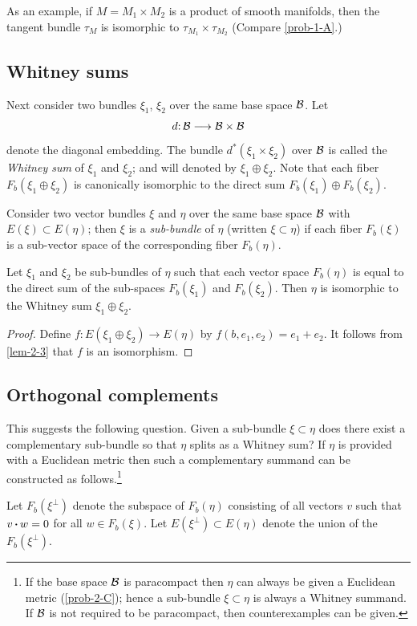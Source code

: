 As an example, if $M = M_1 \times M_2$ is a product of smooth manifolds,
then the tangent bundle $\tau_M$ is isomorphic to $\tau_{M_1}\times \tau_{M_2}$
(Compare
\cref{prob-1-A}.)
\subsection*{Whitney sums}
Next consider two bundles $\xi_1$, $\xi_2$ over the same
base space $\mathcal{B}$. Let
\[d\mathpunct{:}\mathcal{B}\longrightarrow \mathcal{B}\times\mathcal{B} \]
denote the diagonal embedding. The bundle $d^*(\xi_1\times\xi_2)$ over $\mathcal{B}$ is
called the \textit{Whitney sum} of $\xi_1$ and $\xi_2$; and will denoted by $\xi_1\oplus\xi_2$.
Note that each fiber $F_b(\xi_1\oplus\xi_2)$ is canonically isomorphic to the direct
sum
$F_b(\xi_1)\oplus F_b(\xi_2)$.
\begin{definition}\label{def:3-2}
	Consider two vector bundles $\xi$ and $\eta$ over the same base space $\mathcal{B}$ with $E(\xi ) \subset E(\eta)$; then $\xi$ is a \textit{sub-bundle} of $\eta$ (written
	$\xi\subset\eta$) if each fiber $F_b(\xi)$ is a sub-vector space of the corresponding fiber $F_b(\eta)$.
\end{definition}
\begin{lemma}\label{lem-3-2}
	Let $\xi_1$ and $\xi_2$ be sub-bundles of $\eta$ such that
	each vector space $F_b (\eta)$ is equal to the direct sum of the sub-spaces $F_b (\xi_1)$ and $F_b (\xi_2)$. Then $\eta$ is isomorphic to the
	Whitney sum $\xi_1\oplus\xi_2$.
\end{lemma}
\begin{proof}
	Define $f\mathpunct{:}E(\xi_1\oplus\xi_2)\to E(\eta)$ by $f(b,e_1,e_2) =
	e_1 + e_2$. It 
	follows from \cref{lem-2-3} that $f$ is an isomorphism.
\end{proof}
\subsection*{Orthogonal complements}
This suggests the following question.
Given a sub-bundle $\xi\subset\eta$ does there exist a complementary sub-bundle
so that $\eta$ splits as a Whitney sum? If $\eta$ is provided with a Euclidean
metric then such a complementary summand can be constructed as follows.\footnote{If the base space $\mathcal{B}$ is paracompact then $\eta$ can always be given a Euclidean
	metric (\cref{prob-2-C}); hence a sub-bundle $\xi\subset\eta$ is always a Whitney summand. If
	$\mathcal{B}$ is not required to be paracompact, then counterexamples can be given.}

Let $F_b(\xi^\perp)$ denote the subspace of $F_b(\eta)$ consisting of all vectors
$v$ such that $v \operatorname{\boldsymbol{\cdot}}
w = 0$ for all $w\in
F_b(\xi)$. Let $E(\xi^\perp) \subset E(\eta)$ denote the
union of the $F_b(\xi^\perp)$.


